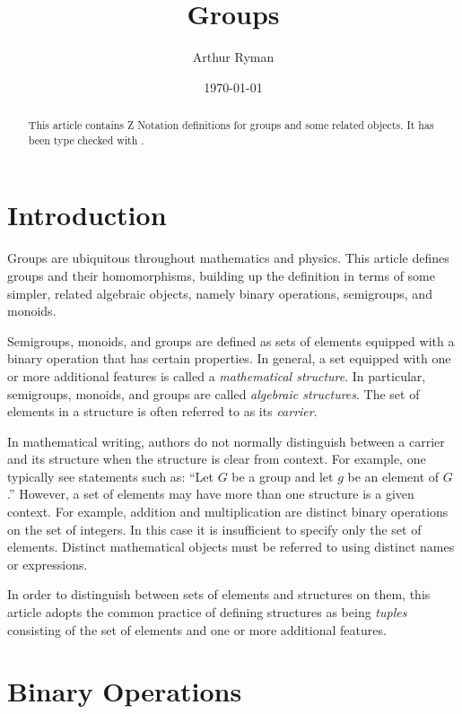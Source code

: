 \documentclass{amsart}
\begin{document}
\title{Groups}
\author{Arthur Ryman}
\date{\today}

\begin{abstract}
This article contains Z Notation definitions for groups and some related objects.
It has been type checked with \fuzz.
\end{abstract}

\maketitle

\tableofcontents

\section{Introduction}

Groups are ubiquitous throughout mathematics and physics.
This article defines groups and their homomorphisms,
building up the definition in terms of some simpler, related algebraic objects,
namely binary operations, semigroups, and monoids.

Semigroups, monoids, and groups are defined as sets of elements equipped with a binary operation that has certain properties.
In general, a set equipped with one or more additional features is called a \textit{mathematical structure}.
In particular, semigroups, monoids, and groups are called \textit{algebraic structures}. 
The set of elements in a structure is often referred to as its \textit{carrier}.

In mathematical writing, authors do not normally distinguish between a carrier and its structure
when the structure is clear from context.
For example, one typically see statements such as:  
``Let $G$ be a group and let $g$ be an element of $G$.''
However, a set of elements may have more than one structure is a given context.
For example, addition and multiplication are distinct binary operations on the set of integers.
In this case it is insufficient to specify only the set of elements.
Distinct mathematical objects
must be referred to using distinct names or expressions.

In order to distinguish between sets of elements and structures on them, 
this article adopts the common practice of defining structures as being \textit{tuples}
consisting of the set of elements and one or more additional features.

\section{Binary Operations}
\end{document}
